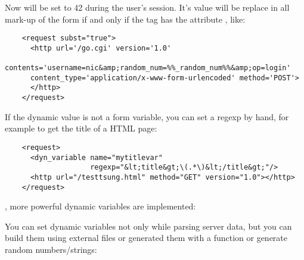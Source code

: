 \documentclass{IDXDOC-en}
\begin{document}
Now  will be set to 42 during the user's session. It's
value will be replace in all mark-up of the form
 if and only if the  tag has the
attribute , like:

\begin{Verbatim}
    <request subst="true">
      <http url='/go.cgi' version='1.0'
      contents='username=nic&amp;random_num=%%_random_num%%&amp;op=login'
      content_type='application/x-www-form-urlencoded' method='POST'>
      </http>
    </request>
\end{Verbatim}

If the dynamic value is not a form variable, you can set a regexp by
hand, for example to get the title of a HTML page:
\begin{Verbatim}
    <request>
      <dyn_variable name="mytitlevar"
                    regexp="&lt;title&gt;\(.*\)&lt;/title&gt;"/>
      <http url="/testtsung.html" method="GET" version="1.0"></http>
    </request>
\end{Verbatim}

, more powerful dynamic variables are implemented:

You can set dynamic variables not only while parsing server data, but
you can build them using external files or generated them with a function
or generate random numbers/strings:
\end{document}
